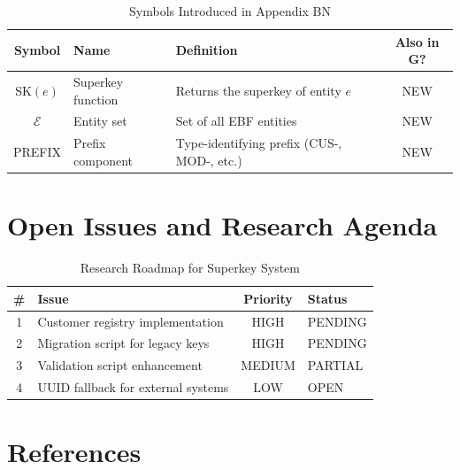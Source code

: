 \begin{table}[htbp]
\centering
\caption{Symbols Introduced in Appendix BN}
\label{tab:superkey-symbols}
\renewcommand{\arraystretch}{1.3}
\begin{tabular}{@{}clp{6cm}c@{}}
\toprule
\textbf{Symbol} & \textbf{Name} & \textbf{Definition} & \textbf{Also in G?} \\
\midrule
SK$(e)$ & Superkey function & Returns the superkey of entity $e$ & NEW \\
$\mathcal{E}$ & Entity set & Set of all EBF entities & NEW \\
PREFIX & Prefix component & Type-identifying prefix (CUS-, MOD-, etc.) & NEW \\
\bottomrule
\end{tabular}
\end{table}


\section{Open Issues and Research Agenda}
\label{sec:superkey-open}

\begin{table}[htbp]
\centering
\caption{Research Roadmap for Superkey System}
\label{tab:superkey-roadmap}
\renewcommand{\arraystretch}{1.3}
\begin{tabular}{@{}clcl@{}}
\toprule
\textbf{\#} & \textbf{Issue} & \textbf{Priority} & \textbf{Status} \\
\midrule
1 & Customer registry implementation & HIGH & PENDING \\
2 & Migration script for legacy keys & HIGH & PENDING \\
3 & Validation script enhancement & MEDIUM & PARTIAL \\
4 & UUID fallback for external systems & LOW & OPEN \\
\bottomrule
\end{tabular}
\end{table}


\section{References}
\label{sec:superkey-references}

